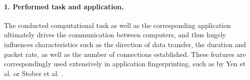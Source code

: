\documentclass[runningheads]{llncs}
\begin{document}


 
\paragraph{1. Performed task and application.}
The conducted computational task as well as the corresponding application ultimately drives the communication between computers, and thus hugely influences characteristics such as the direction of data transfer, the duration and packet rate, as well as the number of connections established. These features are correspondingly used extensively in application fingerprinting, such as by Yen et al. \cite{yen2009browser} or Stober et al. \cite{stober2013you}. %
\end{document}
